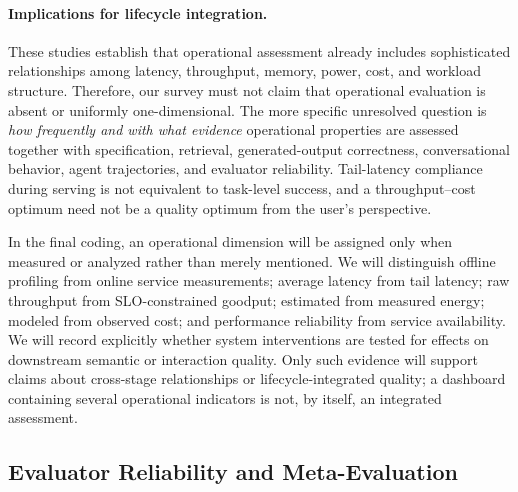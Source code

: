 \paragraph{Implications for lifecycle integration.}
These studies establish that operational assessment already includes sophisticated relationships among latency, throughput, memory, power, cost, and workload structure. Therefore, our survey must not claim that operational evaluation is absent or uniformly one-dimensional. The more specific unresolved question is \emph{how frequently and with what evidence} operational properties are assessed together with specification, retrieval, generated-output correctness, conversational behavior, agent trajectories, and evaluator reliability. Tail-latency compliance during serving is not equivalent to task-level success, and a throughput--cost optimum need not be a quality optimum from the user's perspective.

In the final coding, an operational dimension will be assigned only when measured or analyzed rather than merely mentioned. We will distinguish offline profiling from online service measurements; average latency from tail latency; raw throughput from SLO-constrained goodput; estimated from measured energy; modeled from observed cost; and performance reliability from service availability. We will record explicitly whether system interventions are tested for effects on downstream semantic or interaction quality. Only such evidence will support claims about cross-stage relationships or lifecycle-integrated quality; a dashboard containing several operational indicators is not, by itself, an integrated assessment.

\subsection{Evaluator Reliability and Meta-Evaluation}
\label{sec:evaluator-reliability}

